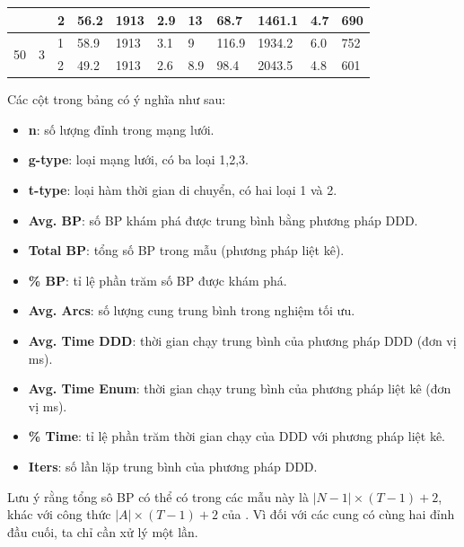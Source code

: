 \documentclass[../main.tex]{subfiles}
\begin{document}
\begin{table}[h]
{\begin{tabular}{|p{0.5cm}|p{1cm}|p{1cm}||p{1.5cm}|p{1.5cm}|p{1.3cm}||p{1.5cm}|p{2.5cm}|p{2.5cm}|p{1.3cm}|p{1.3cm}|}
                    &                    & 2     & 56.2            & 1913     & 2.9             & 13                & 68.7                  & 1461.1                 & 4.7          & 690        \\ \midrule
\multirow{2}{*}{50} & \multirow{2}{*}{3} & 1     & 58.9            & 1913     & 3.1             & 9                 & 116.9                 & 1934.2                 & 6.0          & 752        \\
                    &                    & 2     & 49.2            & 1913     & 2.6             & 8.9               & 98.4                  & 2043.5                 & 4.8          & 601         \\ \bottomrule
  \end{tabular}
  }
\end{table}

Các cột trong bảng có ý nghĩa như sau: 
\begin{itemize}
  \item \textbf{n}: số lượng đỉnh trong mạng lưới.
  \item \textbf{g-type}: loại mạng lưới, có ba loại 1,2,3.
  \item \textbf{t-type}: loại hàm thời gian di chuyển, có hai loại 1 và 2.
  \item \textbf{Avg. BP}: số BP khám phá được trung bình bằng phương pháp DDD.
  \item \textbf{Total BP}: tổng số BP trong mẫu (phương pháp liệt kê).
  \item \textbf{\% BP}: tỉ lệ phần trăm số BP được khám phá.
  \item \textbf{Avg. Arcs}: số lượng cung trung bình trong nghiệm tối ưu.
  \item \textbf{Avg. Time DDD}: thời gian chạy trung bình của phương pháp DDD (đơn vị ms).
  \item \textbf{Avg. Time Enum}: thời gian chạy trung bình của phương pháp liệt kê (đơn vị ms).
  \item \textbf{\% Time}: tỉ lệ phần trăm thời gian chạy của DDD với phương pháp liệt kê.
  \item \textbf{Iters}: số lần lặp trung bình của phương pháp DDD.
\end{itemize}
Lưu ý rằng tổng sô BP có thể có trong các mẫu này là
\(|N − 1| \times (T − 1) + 2\), khác với công thức
\(|A| \times (T − 1) + 2\) của \cite{foschini2011complexity}. Vì đối
với các cung có cùng hai đỉnh đầu cuối, ta chỉ cần xử lý một lần.
\end{document}
